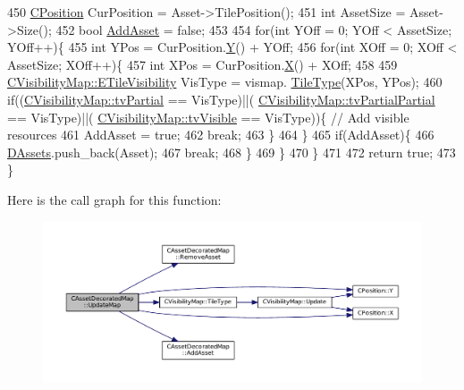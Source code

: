 \begin{DoxyCode}
450         \hyperlink{classCPosition}{CPosition} CurPosition = Asset->TilePosition();
451         \textcolor{keywordtype}{int} AssetSize = Asset->Size();
452         \textcolor{keywordtype}{bool} \hyperlink{classCAssetDecoratedMap_aaa798030159fd44251dd60aef9b00516}{AddAsset} = \textcolor{keyword}{false};
453         
454         \textcolor{keywordflow}{for}(\textcolor{keywordtype}{int} YOff = 0; YOff < AssetSize; YOff++)\{
455             \textcolor{keywordtype}{int} YPos = CurPosition.\hyperlink{classCPosition_a1aa8a30e2f08dda1f797736ba8c13a87}{Y}() + YOff;
456             \textcolor{keywordflow}{for}(\textcolor{keywordtype}{int} XOff = 0; XOff < AssetSize; XOff++)\{
457                 \textcolor{keywordtype}{int} XPos = CurPosition.\hyperlink{classCPosition_a9a6b94d3b91df1492d166d9964c865fc}{X}() + XOff;
458 
459                 \hyperlink{classCVisibilityMap_a6665f905da08825adbb0eee7bd1f2f30}{CVisibilityMap::ETileVisibility} VisType = vismap.
      \hyperlink{classCVisibilityMap_a8517fe52114dd469093fd1bd13482733}{TileType}(XPos, YPos);
460                 \textcolor{keywordflow}{if}((\hyperlink{classCVisibilityMap_a6665f905da08825adbb0eee7bd1f2f30a0037f47075e3bde5e8e32dbd55754976}{CVisibilityMap::tvPartial} == VisType)||(
      \hyperlink{classCVisibilityMap_a6665f905da08825adbb0eee7bd1f2f30a75af969b6d667b802b64bacd8bca7b63}{CVisibilityMap::tvPartialPartial} == VisType)||(
      \hyperlink{classCVisibilityMap_a6665f905da08825adbb0eee7bd1f2f30a3c881652ef7164aa086e595eef0ff5d6}{CVisibilityMap::tvVisible} == VisType))\{ \textcolor{comment}{// Add visible resources}
461                     AddAsset = \textcolor{keyword}{true};
462                     \textcolor{keywordflow}{break};
463                 \}
464             \}
465             \textcolor{keywordflow}{if}(AddAsset)\{
466                 \hyperlink{classCAssetDecoratedMap_a94eeed5b16141169b1ba6cb3842055aa}{DAssets}.push\_back(Asset);
467                 \textcolor{keywordflow}{break};
468             \}
469         \}
470     \}
471     
472     \textcolor{keywordflow}{return} \textcolor{keyword}{true};
473 \}
\end{DoxyCode}
Here is the call graph for this function\+:
\nopagebreak
\begin{figure}[H]
\begin{center}
\leavevmode
\includegraphics[width=350pt]{classCAssetDecoratedMap_a7b594b6bef2eed8bbb0e4e4e6b855903_cgraph}
\end{center}
\end{figure}

